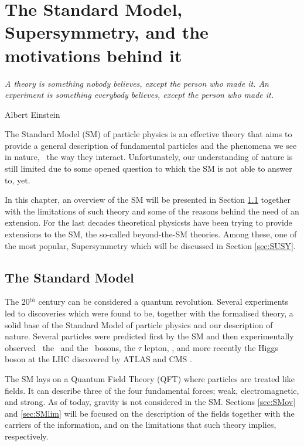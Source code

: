 \chapter{The Standard Model, Supersymmetry, and the motivations behind it}
\label{ch:theory} 
\epigraph{\emph{A theory is something nobody believes, except the person who made it. An experiment is something everybody believes, except the person who made it.}} {Albert Einstein}

	The Standard Model (SM) of particle physics is an effective theory that aims to provide a general description of fundamental particles and the phenomena we see in nature, \ie\ the way they interact. Unfortunately, our understanding of nature is still limited due to some opened question to which the SM is not able to answer to, yet. 

	In this chapter, an overview of the SM will be presented in Section \ref{sec:SM} together with the limitations of such theory and some of the reasons behind the need of an extension. For the last decades theoretical physicsts have been trying to provide extensions to the SM, the so-called beyond-the-SM theories. Among these, one of the most popular, Supersymmetry which will be discussed in Section \ref{sec:SUSY}.  

	
	\section{The Standard Model}
	\label{sec:SM}

		The 20$^{th}$ century can be considered a quantum revolution. Several experiments led to discoveries which were found to be, together with the formalised theory, a solid base of the Standard Model of particle physics and our description of nature. Several particles were predicted first by the SM and then experimentally observed \eg\ the \Wboson\ and the \Zboson\ bosons, the $\tau$ lepton, \cite{Herrero1998}, and more recently the Higgs boson at the LHC discovered by ATLAS \cite{ATLASHiggs2012} and CMS \cite{CMSHiggs2012}.

		The SM lays on a Quantum Field Theory (QFT) where particles are treated like fields. It can describe three of the four fundamental forces; weak, electromagnetic, and strong. As of today, gravity is not considered in the SM. Sections \ref{sec:SMov} and \ref{sec:SMlim} will be focused on the description of the fields together with the carriers of the information, and on the limitations that such theory implies, respectively.


